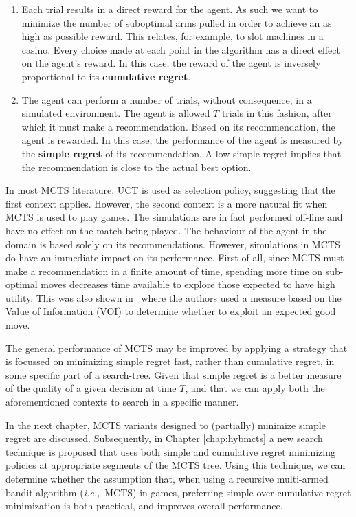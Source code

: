 \documentclass{kecsmstr}
\newcommand{\ie}{{\it i.e.,}~}
\begin{document}
\begin{enumerate}

\item Each trial results in a direct reward for the agent. As such we want to minimize the number of suboptimal arms pulled in order to achieve an as high as possible reward. This relates, for example, to slot machines in a casino. Every choice made at each point in the algorithm has a direct effect on the agent's reward. In this case, the reward of the agent is inversely proportional to its \textbf{cumulative regret}.

\item The agent can perform a number of trials, without consequence, in a simulated environment. The agent is allowed $T$ trials in this fashion, after which it must make a recommendation. Based on its recommendation, the agent is rewarded. In this case, the performance of the agent is measured by the \textbf{simple regret} of its recommendation. A low simple regret implies that the recommendation is close to the actual best option.

\end{enumerate}

In most MCTS literature, UCT is used as selection policy, suggesting that the first context applies. However, the second context is a more natural fit when MCTS is used to play games. The simulations are in fact performed off-line and have no effect on the match being played. The behaviour of the agent in the domain is based solely on its recommendations. 
However, simulations in MCTS do have an immediate impact on its performance. First of all, since MCTS must make a recommendation in a finite amount of time, spending more time on sub-optimal moves decreases time available to explore those expected to have high utility. This was also shown in~ where the authors used a measure based on the Value of Information (VOI) to determine whether to exploit an expected good move.

The general performance of MCTS may be improved by applying a strategy that is focussed on minimizing simple regret fast, rather than cumulative regret, in some specific part of a search-tree. Given that simple regret is a better measure of the quality of a given decision at time $T$, and that we can apply both the aforementioned contexts to search in a specific manner. 

In the next chapter, MCTS variants designed to (partially) minimize simple regret are discussed. Subsequently, in Chapter \ref{chap:hybmcts} a new search technique is proposed that uses both simple and cumulative regret minimizing policies at appropriate segments of the MCTS tree. Using this technique, we can determine whether the assumption that, when using a recursive multi-armed bandit algorithm (\ie MCTS) in games, preferring simple over cumulative regret minimization is both practical, and improves overall performance.
\end{document}
